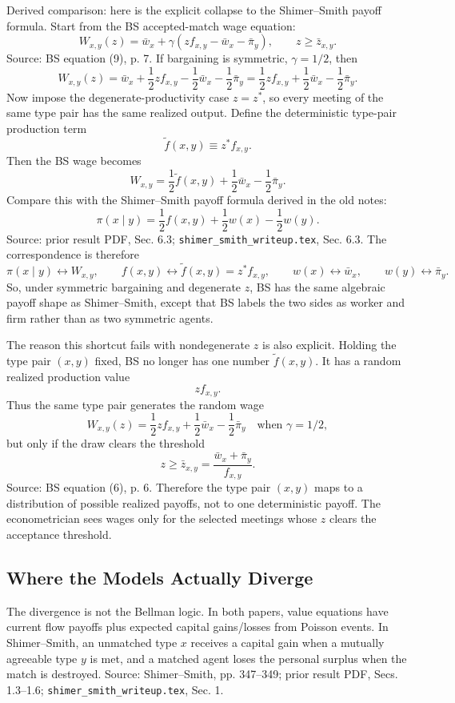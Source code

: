 ﻿\documentclass[11pt]{article}
\newcommand{\1}{\mathbf{1}}
\begin{document}
Derived comparison: here is the explicit collapse to the Shimer--Smith payoff
formula. Start from the BS accepted-match wage equation:
\[
W_{x,y}(z)
=
\bar w_x+\gamma\left(zf_{x,y}-\bar w_x-\bar\pi_y\right),
\qquad z\geq \bar z_{x,y}.
\]
Source: BS equation (9), p. 7. If bargaining is symmetric, $\gamma=1/2$, then
\[
W_{x,y}(z)
=
\bar w_x+\frac12 zf_{x,y}
-\frac12\bar w_x-\frac12\bar\pi_y
=
\frac12 zf_{x,y}
+\frac12\bar w_x
-\frac12\bar\pi_y.
\]
Now impose the degenerate-productivity case $z=z^\ast$, so every meeting of the
same type pair has the same realized output. Define the deterministic type-pair
production term
\[
\tilde f(x,y)\equiv z^\ast f_{x,y}.
\]
Then the BS wage becomes
\[
W_{x,y}
=
\frac12 \tilde f(x,y)
+\frac12\bar w_x
-\frac12\bar\pi_y.
\tag{BS-degenerate}
\]
Compare this with the Shimer--Smith payoff formula derived in the old notes:
\[
\pi(x\mid y)
=
\frac12 f(x,y)
+\frac12 w(x)
-\frac12 w(y).
\tag{SS-payoff}
\]
Source: prior result PDF, Sec. 6.3;
\texttt{shimer\_smith\_writeup.tex}, Sec. 6.3. The correspondence is therefore
\[
\pi(x\mid y)\leftrightarrow W_{x,y},
\qquad
f(x,y)\leftrightarrow \tilde f(x,y)=z^\ast f_{x,y},
\qquad
w(x)\leftrightarrow \bar w_x,
\qquad
w(y)\leftrightarrow \bar\pi_y.
\]
So, under symmetric bargaining and degenerate $z$, BS has the same algebraic
payoff shape as Shimer--Smith, except that BS labels the two sides as worker and
firm rather than as two symmetric agents.

The reason this shortcut fails with nondegenerate $z$ is also explicit. Holding
the type pair $(x,y)$ fixed, BS no longer has one number $\tilde f(x,y)$. It has
a random realized production value
\[
zf_{x,y}.
\]
Thus the same type pair generates the random wage
\[
W_{x,y}(z)
=
\frac12 zf_{x,y}
+\frac12\bar w_x
-\frac12\bar\pi_y
\quad\text{when }\gamma=1/2,
\]
but only if the draw clears the threshold
\[
z\geq \bar z_{x,y}
=
\frac{\bar w_x+\bar\pi_y}{f_{x,y}}.
\]
Source: BS equation (6), p. 6. Therefore the type pair $(x,y)$ maps to a
distribution of possible realized payoffs, not to one deterministic payoff. The
econometrician sees wages only for the selected meetings whose $z$ clears the
acceptance threshold.

\subsection{Where the Models Actually Diverge}

The divergence is not the Bellman logic. In both papers, value equations have
current flow payoffs plus expected capital gains/losses from Poisson events. In
Shimer--Smith, an unmatched type $x$ receives a capital gain when a mutually
agreeable type $y$ is met, and a matched agent loses the personal surplus when
the match is destroyed. Source: Shimer--Smith, pp. 347--349; prior result PDF,
Secs. 1.3--1.6; \texttt{shimer\_smith\_writeup.tex}, Sec. 1.
\end{document}
